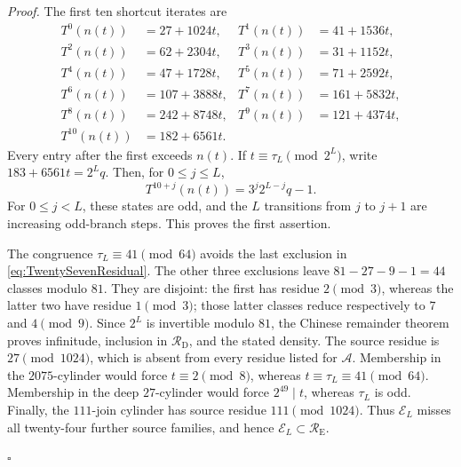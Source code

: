 \documentclass[11pt,letterpaper]{article}
\newenvironment{proof}{\noindent\textit{Proof.}}{\hfill\(\square\)}
\begin{document}
\begin{proof}
The first ten shortcut iterates are
\[
\begin{aligned}
T^0(n(t))&=27+1024t,  &T^1(n(t))&=41+1536t,\\
T^2(n(t))&=62+2304t, &T^3(n(t))&=31+1152t,\\
T^4(n(t))&=47+1728t, &T^5(n(t))&=71+2592t,\\
T^6(n(t))&=107+3888t,&T^7(n(t))&=161+5832t,\\
T^8(n(t))&=242+8748t,&T^9(n(t))&=121+4374t,\\
T^{10}(n(t))&=182+6561t.&&
\end{aligned}
\]
Every entry after the first exceeds \(n(t)\). If
\(t\equiv\tau_L\pmod{2^L}\), write
\(183+6561t=2^Lq\). Then, for \(0\le j\le L\),
\[
T^{10+j}(n(t))=3^j2^{L-j}q-1.
\]
For \(0\le j<L\), these states are odd, and the \(L\) transitions from
\(j\) to \(j+1\) are increasing odd-branch steps. This proves the first
assertion.

The congruence \(\tau_L\equiv41\pmod{64}\) avoids the last exclusion in
\eqref{eq:TwentySevenResidual}. The other three exclusions leave
\(81-27-9-1=44\) classes modulo \(81\). They are disjoint: the first
has residue \(2\pmod3\), whereas the latter two have residue
\(1\pmod3\); those latter classes reduce respectively to \(7\) and
\(4\pmod9\). Since \(2^L\) is invertible modulo \(81\), the Chinese
remainder theorem proves infinitude,
inclusion in \(\mathcal R_{\mathrm D}\), and the stated density.
The source residue is \(27\pmod{1024}\), which is absent from every
residue listed for \(\mathcal A\). Membership in the \(2075\)-cylinder
would force \(t\equiv2\pmod8\), whereas
\(t\equiv\tau_L\equiv41\pmod{64}\). Membership in the deep
\(27\)-cylinder would force \(2^{49}\mid t\), whereas \(\tau_L\) is
odd. Finally, the \(111\)-join cylinder has source residue
\(111\pmod{1024}\). Thus \(\mathcal E_L\) misses all twenty-four
further source families, and hence
\(\mathcal E_L\subset\mathcal R_{\mathrm E}\).


\end{proof}
\end{document}
